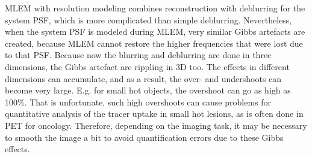 MLEM with resolution modeling combines reconstruction with deblurring
for the system PSF, which is more complicated than simple
deblurring. Nevertheless, when the system PSF is modeled during MLEM,
very similar Gibbs artefacts are created, because MLEM cannot restore
the higher frequencies that were lost due to that PSF. Because now the
blurring and deblurring are done in three dimensions, the Gibbs
artefact are rippling in 3D too. The effects in different dimensions
can accumulate, and as a result, the over- and undershoots can become
very large. E.g. for small hot objects, the overshoot can go as high
as 100\%. That is unfortunate, such high overshoots can cause problems
for quantitative analysis of the tracer uptake in small hot lesions,
as is often done in PET for oncology. Therefore, depending on the
imaging task, it may be necessary to smooth the image a bit to avoid
quantification errors due to these Gibbs effects.